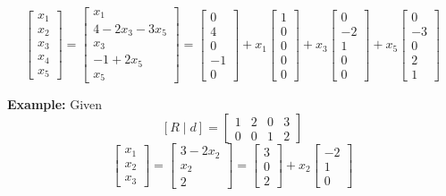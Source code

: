 \documentclass{article}
\begin{document}
\[
\begin{bmatrix} x_1 \\ x_2 \\ x_3 \\ x_4 \\ x_5 \end{bmatrix}
=
\begin{bmatrix} x_1 \\ 4 - 2x_3 - 3x_5 \\ x_3 \\ -1 + 2x_5 \\ x_5 \end{bmatrix}
=
\begin{bmatrix} 0 \\ 4 \\ 0 \\ -1 \\ 0 \end{bmatrix}
+ x_1 \begin{bmatrix} 1 \\ 0 \\ 0 \\ 0 \\ 0 \end{bmatrix}
+ x_3 \begin{bmatrix} 0 \\ -2 \\ 1 \\ 0 \\ 0 \end{bmatrix}
+ x_5 \begin{bmatrix} 0 \\ -3 \\ 0 \\ 2 \\ 1 \end{bmatrix}
\]

\bigskip

\textbf{Example:} Given
\[
[R \mid d] = \left[ \begin{array}{ccc|c} 1 & 2 & 0 & 3 \\ 0 & 0 & 1 & 2 \end{array} \right]
\]
\[
\begin{bmatrix} x_1 \\ x_2 \\ x_3 \end{bmatrix}
=
\begin{bmatrix} 3 - 2x_2 \\ x_2 \\ 2 \end{bmatrix}
=
\begin{bmatrix} 3 \\ 0 \\ 2 \end{bmatrix}
+ x_2 \begin{bmatrix} -2 \\ 1 \\ 0 \end{bmatrix}
\]
\end{document}

